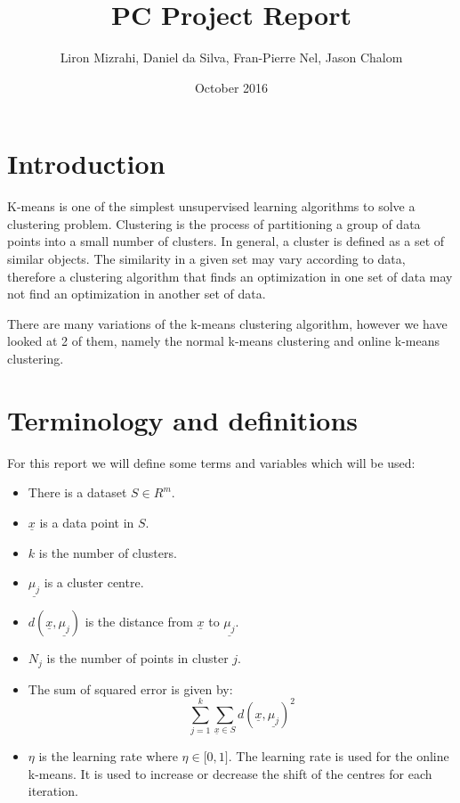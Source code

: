 \documentclass{article}
\title{PC Project Report}
\author{Liron Mizrahi, Daniel da Silva, Fran-Pierre Nel, Jason Chalom}
\date{October 2016}
\begin{document}
\maketitle


\newpage
\section{Introduction}
K-means is  one of the simplest unsupervised learning algorithms to solve a clustering problem. Clustering is the process of partitioning a group of data points into a small number of clusters. In general, a cluster is defined as a set of similar objects. The similarity in a given set may vary according to data, therefore a clustering algorithm that finds an optimization in one set of data may not find an optimization in another set of data.

There are many variations of the k-means clustering algorithm, however we have looked at 2 of them, namely the normal k-means clustering and online k-means clustering.


\section{Terminology and definitions}
For this report we will define some terms and variables which will be used:
\begin{itemize}
	\item There is a dataset $S \in R^m$.
	\item $\underline{x}$ is a data point in $S$.
	\item $k$ is the number of clusters.
	\item $\underline{\mu_j}$ is a cluster centre.
	\item $d(\underline{x}, \underline{\mu_j})$ is the distance from $\underline{x}$ to $\underline{\mu_j}$.
	\item $N_j$ is the number of points in cluster $j$.
	\item The sum of squared error is given by:
    $$\sum_{j=1}^{k}\sum_{\underline{x} \in S} d(\underline{x}, \underline{\mu_j})^2 $$
	\item $\eta$ is the learning rate where $\eta \in \big[0, 1\big]$. The learning rate is used for the online k-means. It is used to increase or decrease the shift of the centres for each iteration.
\end{itemize}


\newpage
\end{document}
